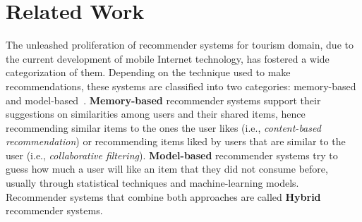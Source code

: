\vspace{-0.2cm}
\section{Related Work} \label{section:related-work}




The unleashed proliferation  of recommender systems for tourism domain, due to the current development of mobile Internet technology, has fostered a wide categorization of them. 
Depending on the technique used to 
make recommendations, these systems are %
classified into two categories: memory-based and model-based~\cite{bobadilla2013recommender,ebrahim_2012}. \textbf{Memory-based} recommender systems support their  suggestions on similarities among users and their shared items, hence recommending similar items to the ones the user likes (i.e., \textit{content-based recommendation}) or recommending items liked by users that are similar to the user (i.e., \textit{collaborative filtering}). \textbf{Model-based} recommender systems try to guess how much a user will like an item that they did not consume before, usually through statistical techniques and machine-learning models. Recommender systems that combine both 
approaches are called \textbf{Hybrid} recommender systems.

